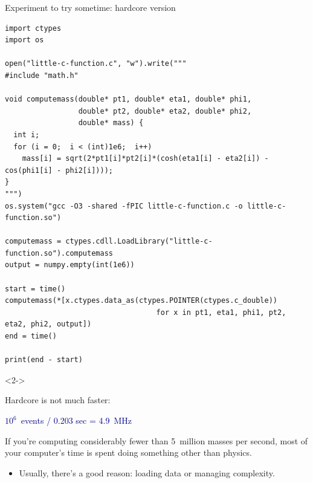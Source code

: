 \documentclass[aspectratio=169]{beamer}
\begin{document}
\begin{frame}[fragile]{Experiment to try sometime: hardcore version}
\vspace{0.1 cm}
\scriptsize
\begin{verbatim}
import ctypes
import os

open("little-c-function.c", "w").write("""
#include "math.h"

void computemass(double* pt1, double* eta1, double* phi1,
                 double* pt2, double* eta2, double* phi2,
                 double* mass) {
  int i;
  for (i = 0;  i < (int)1e6;  i++)
    mass[i] = sqrt(2*pt1[i]*pt2[i]*(cosh(eta1[i] - eta2[i]) - cos(phi1[i] - phi2[i])));
}
""")
os.system("gcc -O3 -shared -fPIC little-c-function.c -o little-c-function.so")

computemass = ctypes.cdll.LoadLibrary("little-c-function.so").computemass
output = numpy.empty(int(1e6))

start = time()
computemass(*[x.ctypes.data_as(ctypes.POINTER(ctypes.c_double))
                                   for x in pt1, eta1, phi1, pt2, eta2, phi2, output])
end = time()

print(end - start)
\end{verbatim}
\normalsize
\vspace{-8 cm}\hfill\begin{minipage}{0.35\linewidth}
\begin{uncoverenv}<2->
\begin{center}
Hardcore is not much faster:

\textcolor{darkblue}{$10^6$~events / 0.203 sec = 4.9~MHz}
\end{center}
\end{uncoverenv}
\vspace{8 cm}
\end{minipage}
\end{frame}

\begin{frame}{}
\vspace{1 cm}
\begin{center}
\large If you're computing considerably fewer than 5~million masses per second, most of your computer's time is spent doing something other than physics.
\end{center}

\vspace{0.5 cm}
\begin{itemize}
\item<2-> Usually, there's a good reason: loading data or managing complexity.
\end{itemize}
\end{frame}
\end{document}
